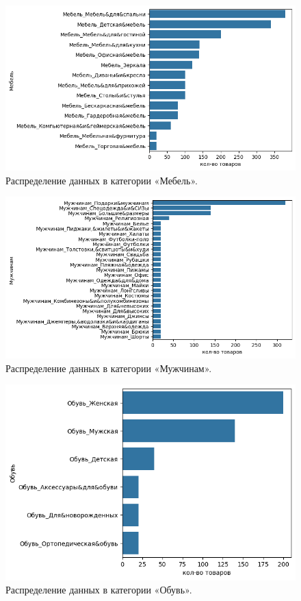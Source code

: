 \documentclass[a4paper,12pt]{extarticle}
\begin{document}
\begin{figure}[hbtp]
	\centering
	\includegraphics[scale=0.8]{приложения/amount_of_category_Мебель.png}
	\caption{Распределение данных в категории «Мебель».}
	\label{fig:amount_of_category_Мебель}
\end{figure}

\begin{figure}[hbtp]
	\centering
	\includegraphics[scale=0.8]{приложения/amount_of_category_Мужчинам.png}
	\caption{Распределение данных в категории «Мужчинам».}
	\label{fig:amount_of_category_Мужчинам}
\end{figure}

\begin{figure}[hbtp]
	\centering
	\includegraphics[scale=0.8]{приложения/amount_of_category_Обувь.png}
	\caption{Распределение данных в категории «Обувь».}
	\label{fig:amount_of_category_Обувь}
\end{figure}
\end{document}
